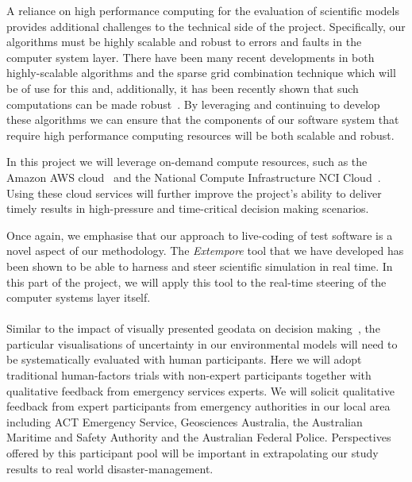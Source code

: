 \documentclass[a4paper,fontsize=12pt]{scrartcl}
\begin{document}
A reliance on high performance computing for the evaluation of scientific 
models provides additional challenges to the technical side of the project. 
Specifically, our algorithms must be highly scalable and robust to errors and faults in the computer system layer.
There have been many recent developments in both highly-scalable algorithms 
and the sparse grid combination technique which will be of use for this and,
additionally, it has been recently shown that such computations can be made robust~\parencite{HardingHLS2015,AliEtal2015}.
By leveraging and continuing to develop these algorithms we can ensure that
the components of our software system that require high performance 
computing resources will be both scalable and robust.

In this project we will leverage on-demand compute resources, such as
the Amazon AWS cloud~\parencite{amazon_aws} and the National Compute
Infrastructure NCI Cloud~\parencite{nci_cloud}. Using these cloud
services will further improve the project's ability to deliver timely
results in high-pressure and time-critical decision making scenarios.

Once again, we emphasise that our approach to live-coding of test software is a novel aspect of our methodology. The {\em Extempore} tool that we have developed has been shown to be able to harness and steer scientific simulation in real time. In this part of the project, we will apply this tool to the real-time steering of the computer systems layer itself.\\


\\

Similar to the impact of visually presented geodata on decision making~\parencite{kinkeldey2015evaluating}, the particular visualisations of 
uncertainty in our environmental models will need to be systematically evaluated with 
human participants. Here we will adopt traditional human-factors trials with non-expert participants together with qualitative feedback from emergency services experts. We will solicit qualitative feedback from expert participants from emergency authorities in our local area including ACT Emergency Service, Geosciences Australia, the Australian Maritime and Safety Authority and the Australian Federal Police. Perspectives offered by this participant pool will be important in extrapolating our study results to real world disaster-management. 
\end{document}
